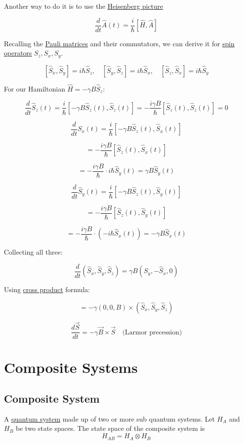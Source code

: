 \documentclass[
]{article}
\let\oldhyperref\hyperref
\renewcommand{\hyperref}[2][]{\oldhyperref[#1]{\underline{#2}}}
\begin{document}
Another way to do it is to use the \hyperref[heisenberg-picture]{Heisenberg picture}

\[
	\frac{d}{dt}\hat{A}(t) = \frac{i}{\hbar}[\hat{H}, \hat{A}]
\]

Recalling the \hyperref[pauli-matrices]{Pauli matrices} and their commutators, we can derive it for \hyperref[quantum-system]{spin operators} $S_z,S_x,S_y$.

\[
	[\hat{S}_x, \hat{S}_y] = i\hbar\hat{S}_z, \quad [\hat{S}_y, \hat{S}_z] = i\hbar\hat{S}_x, \quad [\hat{S}_z, \hat{S}_x] = i\hbar\hat{S}_y
\]

For our Hamiltonian \(\hat{H} = -\gamma B \hat{S}_z\):

\[
	\frac{d}{dt}\hat{S}_z(t) = \frac{i}{\hbar}[-\gamma B \hat{S}_z(t), \hat{S}_z(t)] = -\frac{i\gamma B}{\hbar}[\hat{S}_z(t), \hat{S}_z(t)] = 0
\]

\[
	\frac{d}{dt}\hat{S}_x(t) = \frac{i}{\hbar}[-\gamma B \hat{S}_z(t), \hat{S}_x(t)]
\]

\[
	= -\frac{i\gamma B}{\hbar}[\hat{S}_z(t), \hat{S}_x(t)]
\]

\[
	= -\frac{i\gamma B}{\hbar}\cdot i\hbar \hat{S}_y(t) = \gamma B \hat{S}_y(t)
\]

\[
	\frac{d}{dt}\hat{S}_y(t) = \frac{i}{\hbar}[-\gamma B \hat{S}_z(t), \hat{S}_y(t)]
\]

\[
	= -\frac{i\gamma B}{\hbar}[\hat{S}_z(t), \hat{S}_y(t)]
\]

\[
	= -\frac{i\gamma B}{\hbar}\cdot(-i\hbar \hat{S}_x(t)) = -\gamma B \hat{S}_x(t)
\]

Collecting all three:

\[
	\frac{d}{dt}(\hat{S}_x, \hat{S}_y, \hat{S}_z) = \gamma B(\hat{S}_y, -\hat{S}_x, 0)
\]

Using \hyperref[cross-product]{cross product} formula:

\[
	= -\gamma(0, 0, B)\times(\hat{S}_x, \hat{S}_y, \hat{S}_z)
\]

\[
	\boxed{\frac{d\vec{S}}{dt} = -\gamma \vec{B}\times\vec{S}} \quad \text{(Larmor precession)}
\]


\section{Composite Systems}\label{composite-systems}
\subsection{Composite System}\label{composite-system}
A \hyperref[quantum-system]{quantum system} made up of two or more sub quantum systems.
Let $H_A$ and $H_B$ be two state spaces. The state space of the composite system is
\[
	H_{AB} = H_A\otimes H_B
\]
\end{document}
